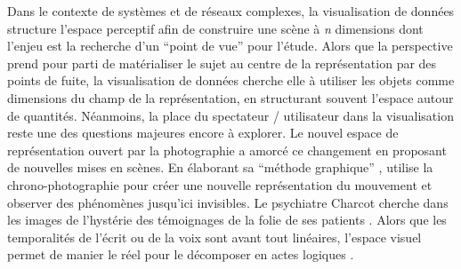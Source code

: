 Dans le contexte de systèmes et de réseaux complexes, la visualisation de données structure l{\textquoteright}espace perceptif afin de construire une scène à \textit{n }dimensions dont l{\textquoteright}enjeu est la recherche d{\textquoteright}un {\textquotedblleft}point de vue{\textquotedblright} pour l{\textquoteright}étude\textit{. }Alors que la perspective prend pour parti de matérialiser le sujet au centre de la représentation par des points de fuite, la visualisation de données cherche elle à utiliser les objets comme dimensions du champ de la représentation, en structurant souvent l{\textquoteright}espace autour de quantités. Néanmoins, la place du spectateur / utilisateur dans la visualisation reste une des questions majeures encore à explorer. Le nouvel espace de représentation ouvert par la photographie a amorcé ce changement en proposant de nouvelles mises en scènes. En élaborant sa {\textquotedblleft}méthode graphique{\textquotedblright} , \cite{Marey1885} utilise la chrono-photographie pour créer une nouvelle représentation du mouvement et observer des phénomènes jusqu{\textquoteright}ici invisibles. Le psychiatre Charcot cherche dans les images de l{\textquoteright}hystérie des témoignages de la folie de ses patients \citep{DidiHuberman2012}. Alors que les temporalités de l{\textquoteright}écrit ou de la voix sont avant tout linéaires, l{\textquoteright}espace visuel permet de manier le réel pour le décomposer en actes logiques \cite{Lafont2010}. 

